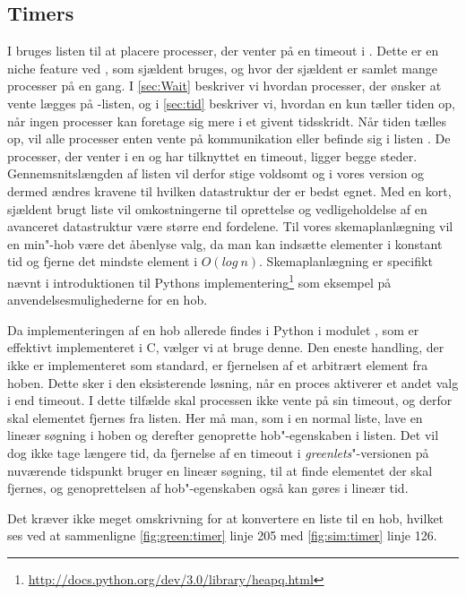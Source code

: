 \subsection{Timers}  
I \pycsp bruges listen  til at placere processer, der venter på en timeout i . Dette er en niche feature ved \pycsp, som  sjældent bruges, og hvor der sjældent er samlet mange processer på en gang. 
I \cref{sec:Wait} beskriver vi hvordan processer, der ønsker at vente lægges på -listen, og i \cref{sec:tid} beskriver vi, hvordan \sched en kun tæller tiden op, når ingen processer kan foretage sig mere i et givent tidsskridt. Når tiden tælles op, vil  alle processer enten vente på kommunikation eller befinde sig i listen . De processer, der venter i en  og har tilknyttet en timeout, ligger begge steder. Gennemsnitslængden af listen vil derfor stige voldsomt og i vores version og dermed ændres kravene til hvilken  datastruktur der er bedst egnet. 
Med en kort, sjældent brugt liste vil omkostningerne til oprettelse og vedligeholdelse af en avanceret datastruktur være større end fordelene. Til vores skemaplanlægning  vil en min"-hob være det åbenlyse valg, da  man kan  indsætte elementer i konstant tid og fjerne det mindste element i $O(log\ n)$. Skemaplanlægning er specifikt nævnt i introduktionen til Pythons implementering\footnote{\url{http://docs.python.org/dev/3.0/library/heapq.html}} som eksempel på anvendelsesmulighederne for en hob. 

Da implementeringen af en hob allerede findes i Python i modulet , som er effektivt implementeret i C, vælger vi at bruge denne. Den eneste handling,
der ikke er implementeret som standard, er fjernelsen af et arbitrært element fra hoben. Dette sker i den eksisterende løsning, når en proces
aktiverer et andet valg i  end timeout. I dette tilfælde skal
processen ikke vente på sin timeout, og derfor skal elementet fjernes fra  listen. Her må man, som i
en normal liste, lave en lineær søgning i hoben og derefter genoprette
hob"-egenskaben i listen. Det vil dog ikke tage længere tid, da fjernelse af en timeout i \emph{greenlets}"-versionen på nuværende
tidspunkt bruger en lineær søgning, til at finde elementet der skal
fjernes, og genoprettelsen af hob"-egenskaben også kan gøres i lineær tid.

Det kræver ikke meget omskrivning for at konvertere en liste til en hob, hvilket ses ved at sammenligne \cref{fig:green:timer} linje 205 med \cref{fig:sim:timer} linje 126. 

